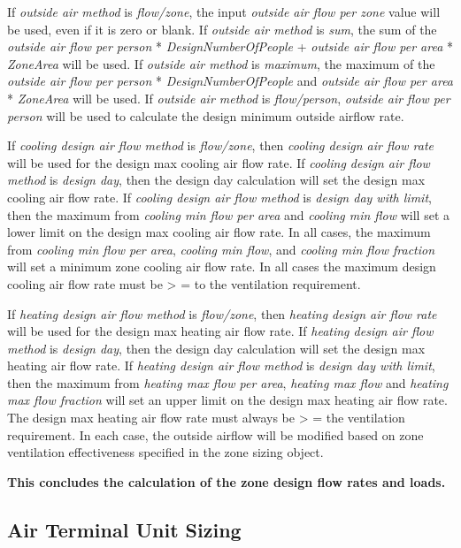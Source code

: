 If \emph{outside air method} is \emph{flow/zone}, the input \emph{outside air flow per zone} value will be used, even if it is zero or blank. If \emph{outside air method} is \emph{sum}, the sum of the \emph{outside air flow per person} * \emph{DesignNumberOfPeople} + \emph{outside air flow per area} * \emph{ZoneArea} will be used. If \emph{outside air method} is \emph{maximum}, the maximum of the \emph{outside air flow per person} * \emph{DesignNumberOfPeople} and \emph{outside air flow per area} * \emph{ZoneArea} will be used. If \emph{outside air method} is \emph{flow/person}, \emph{outside air flow per person} will be used to calculate the design minimum outside airflow rate.

If \emph{cooling design air flow method} is \emph{flow/zone}, then \emph{cooling design air flow rate} will be used for the design max cooling air flow rate. If \emph{cooling design air flow method} is \emph{design day}, then the design day calculation will set the design max cooling air flow rate. If \emph{cooling design air flow method} is \emph{design day with limit}, then the maximum from \emph{cooling min flow per area} and \emph{cooling min flow} will set a lower limit on the design max cooling air flow rate. In all cases, the maximum from \emph{cooling min flow per area}, \emph{cooling min flow}, and \emph{cooling min flow fraction} will set a minimum zone cooling air flow rate. In all cases the maximum design cooling air flow rate must be \textgreater{} = to the ventilation requirement.

If \emph{heating design air flow method} is \emph{flow/zone}, then \emph{heating design air flow rate} will be used for the design max heating air flow rate. If \emph{heating design air flow method} is \emph{design day}, then the design day calculation will set the design max heating air flow rate. If \emph{heating design air flow method} is \emph{design day with limit}, then the maximum from \emph{heating max flow per area}, \emph{heating max flow} and \emph{heating max flow fraction} will set an upper limit on the design max heating air flow rate. The design max heating air flow rate must always be \textgreater{} = the ventilation requirement. In each case, the outside airflow will be modified based on zone ventilation effectiveness specified in the zone sizing object.

\textbf{This concludes the calculation of the zone design flow rates and loads.}

\subsection{Air Terminal Unit Sizing}\label{air-terminal-unit-sizing}

